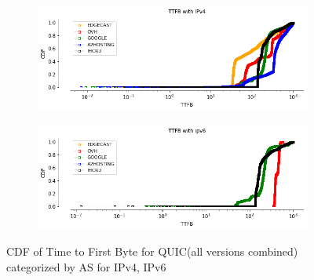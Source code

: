 \begin{frame}

\begin{figure}[!htb]
    
    \begin{subfigure}{0.5\textwidth}
        \includegraphics[width=\linewidth]
        {./plots/VM//TTFB_ipv4_asno.png}
    \end{subfigure}
    \begin{subfigure}{0.5\textwidth}
        \includegraphics[width=\linewidth]
        {./plots/VM/TTFB_ipv6_asno.png}
    \end{subfigure}
    \caption{\label{fig:TTFB_ipv6_asno}CDF of Time to First Byte for QUIC(all versions combined) categorized by AS for IPv4, IPv6}
\end{figure}

\end{frame}
\clearpage

